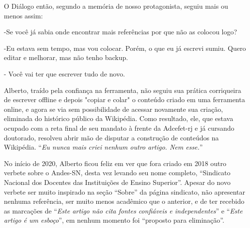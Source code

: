 O Diálogo então, segundo a memória de nosso protagonista, seguiu mais ou menos assim:

-Se você já sabia onde encontrar mais referências por que não as colocou logo?

-Eu estava sem tempo, mas vou colocar. Porém, o que eu já escrevi sumiu. Quero editar e melhorar, mas não tenho backup.

- Você vai ter que escrever tudo de novo.

Alberto, traído pela confiança na ferramenta, não seguiu sua prática corriqueira de escrever offline e depois "copiar e colar" o conteúdo criado em uma ferramenta online, e agora se via sem possibilidade de acessar novamente sua criação, eliminada do histórico público da Wikipédia.
Como resultado, ele, que estava ocupado com a reta final de seu mandato à frente da Adcefet-rj e já cursando doutorado, resolveu abrir mão de disputar a construção de conteúdos na Wikipédia. ``\textit{Eu nunca mais criei nenhum outro artigo. Nem esse.}''

No início de 2020, Alberto ficou feliz em ver que fora criado em 2018 outro verbete sobre o Andes-SN, desta vez levando seu nome completo, ``Sindicato Nacional dos Docentes das Instituições de Ensino Superior''. Apesar do novo verbete ser muito inspirado na seção ``Sobre'' da página sindicato, não apresentar nenhuma referência, ser muito menos acadêmico que o anterior, e de ter recebido as marcações de ``\textit{Este artigo não cita fontes confiáveis e independentes}'' e ``\textit{Este artigo é um esboço}'', em nenhum momento foi ``proposto para eliminação''.